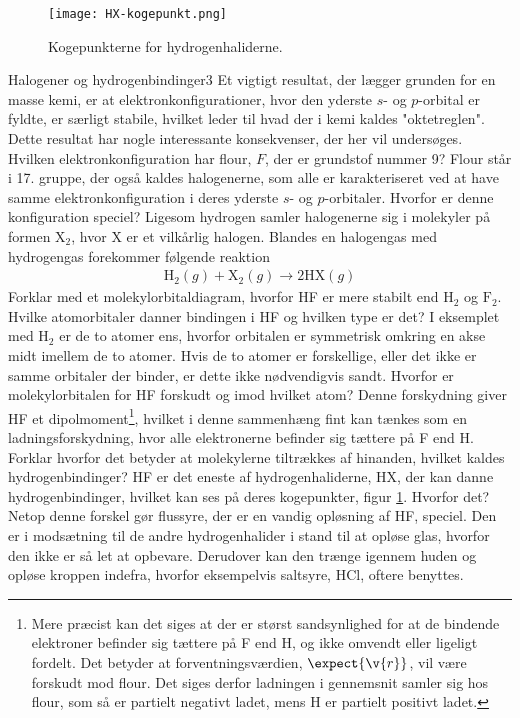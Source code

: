 \begin{figure}[t]
	\centering
	\texttt{[image: HX-kogepunkt.png]}
	\caption{Kogepunkterne for hydrogenhaliderne.} %
	\label{fig:HX-kogepunkt}
\end{figure}
\begin{opgave}{Halogener og hydrogenbindinger}{3}
Et vigtigt resultat, der lægger grunden for en masse kemi, er at elektronkonfigurationer, hvor den yderste $s$- og $p$-orbital er fyldte, er særligt stabile, hvilket leder til hvad der i kemi kaldes "oktetreglen". Dette resultat har nogle interessante konsekvenser, der her vil undersøges.
\opg Hvilken elektronkonfiguration har flour, $F$, der er grundstof nummer 9?
\opg Flour står i 17. gruppe, der også kaldes halogenerne, som alle er karakteriseret ved at have samme elektronkonfiguration i deres yderste $s$- og $p$-orbitaler. Hvorfor er denne konfiguration speciel?
\opg Ligesom hydrogen samler halogenerne sig i molekyler på formen $\mathrm{X}_2$, hvor X er et vilkårlig halogen. Blandes en halogengas med hydrogengas forekommer følgende reaktion
\begin{align*}
	\mathrm{H}_2(g) + \mathrm{X}_2(g) \rightarrow 2 \mathrm{HX}(g)
\end{align*}
Forklar med et molekylorbitaldiagram, hvorfor HF er mere stabilt end $\mathrm{H}_2$ og $\mathrm{F}_2$.
\opg Hvilke atomorbitaler danner bindingen i HF og hvilken type er det?
\opg I eksemplet med $\mathrm{H}_2$ er de to atomer ens, hvorfor orbitalen er symmetrisk omkring en akse midt imellem de to atomer. Hvis de to atomer er forskellige, eller det ikke er samme orbitaler der binder, er dette ikke nødvendigvis sandt. Hvorfor er molekylorbitalen for HF forskudt og imod hvilket atom?
\opg Denne forskydning giver HF et dipolmoment\footnote{Mere præcist kan det siges at der er størst sandsynlighed for at de bindende elektroner befinder sig tættere på F end H, og ikke omvendt eller ligeligt fordelt. Det betyder at forventningsværdien, $\expect{\v{r}}$, vil være forskudt mod flour. Det siges derfor ladningen i gennemsnit samler sig hos flour, som så er partielt negativt ladet, mens H er partielt positivt ladet.}, hvilket i denne sammenhæng fint kan tænkes som en ladningsforskydning, hvor alle elektronerne befinder sig tættere på F end H. Forklar hvorfor det betyder at molekylerne tiltrækkes af hinanden, hvilket kaldes hydrogenbindinger?
\opg HF er det eneste af hydrogenhaliderne, HX, der kan danne hydrogenbindinger, hvilket kan ses på deres kogepunkter, figur \ref{fig:HX-kogepunkt}. Hvorfor det? \\
Netop denne forskel gør flussyre, der er en vandig opløsning af HF, speciel. Den er i modsætning til de andre hydrogenhalider i stand til at opløse glas, hvorfor den ikke er så let at opbevare. Derudover kan den trænge igennem huden og opløse kroppen indefra, hvorfor eksempelvis saltsyre, HCl, oftere benyttes.
\end{opgave}